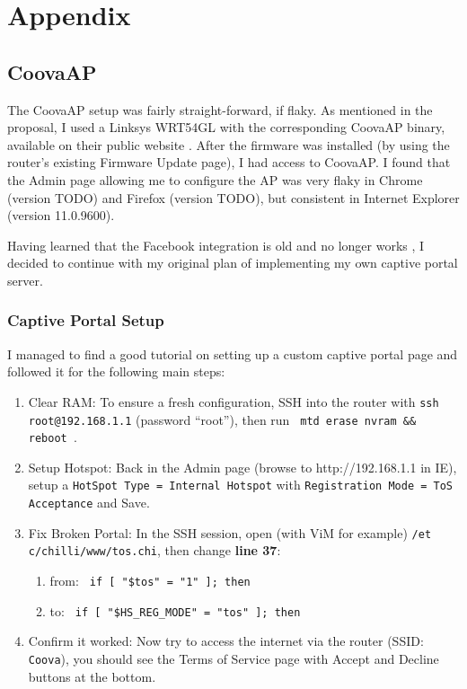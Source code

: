 \section{Appendix}
\label{section:appendix}

\subsection{CoovaAP}
The CoovaAP setup was fairly straight-forward, if flaky. As mentioned in the proposal, I used a
Linksys WRT54GL \cite{product:WRT54GL} with the corresponding CoovaAP binary, available on their
public website \cite{product:CoovaAPBin}. After the firmware was installed (by using the router's
existing Firmware Update page), I had access to CoovaAP. I found that the Admin page allowing me to
configure the AP was very flaky in Chrome (version TODO) and Firefox (version TODO), but consistent
in Internet Explorer (version 11.0.9600).

Having learned that the Facebook integration is old and no longer works
\cite{article:CoovaFacebookNoMore}, I decided to continue with my original plan of implementing my
own captive portal server.

\subsubsection{Captive Portal Setup}
I managed to find a good tutorial \cite{article:CoovaHotSpotSetup} on setting up a custom captive
portal page and followed it for the following main steps:
\begin{enumerate}
\item{Clear RAM:}  To ensure a fresh configuration, SSH into the router with \texttt{ssh
root@192.168.1.1} (password ``root''), then run \texttt{ mtd erase nvram \&\& reboot }.
\item{Setup Hotspot:}  Back in the Admin page (browse to http://192.168.1.1 in IE), setup a
\texttt{HotSpot Type = Internal Hotspot} with \texttt{Registration Mode = ToS Acceptance} and Save.
\item{Fix Broken Portal:}  In the SSH session, open (with ViM for example)
\texttt{/et c/chilli/www/tos.chi}, then change \textbf{line 37}:
  \begin{enumerate}
  \item{from:} \texttt{ if [ "\$tos" = "1" ]; then }
  \item{to:} \texttt{ if [ "\$HS\_REG\_MODE" = "tos" ]; then}
  \end{enumerate}
\item{Confirm it worked:}  Now try to access the internet via the router (SSID: \texttt{Coova}), you
should see the Terms of Service page with Accept and Decline buttons at the bottom.
\end{enumerate}